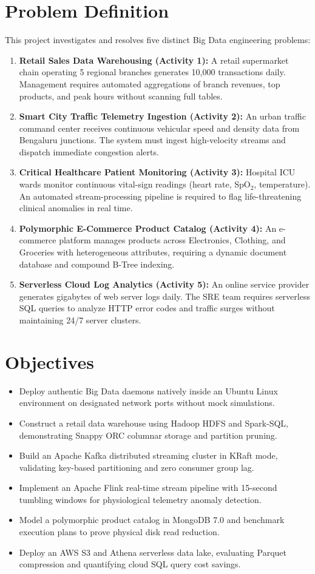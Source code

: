 \documentclass[12pt,a4paper]{report}
\begin{document}
\section{Problem Definition}
This project investigates and resolves five distinct Big Data engineering problems:
\begin{enumerate}
    \item \textbf{Retail Sales Data Warehousing (Activity 1):} A retail supermarket chain operating 5 regional branches generates 10,000 transactions daily. Management requires automated aggregations of branch revenues, top products, and peak hours without scanning full tables.
    \item \textbf{Smart City Traffic Telemetry Ingestion (Activity 2):} An urban traffic command center receives continuous vehicular speed and density data from Bengaluru junctions. The system must ingest high-velocity streams and dispatch immediate congestion alerts.
    \item \textbf{Critical Healthcare Patient Monitoring (Activity 3):} Hospital ICU wards monitor continuous vital-sign readings (heart rate, SpO$_2$, temperature). An automated stream-processing pipeline is required to flag life-threatening clinical anomalies in real time.
    \item \textbf{Polymorphic E-Commerce Product Catalog (Activity 4):} An e-commerce platform manages products across Electronics, Clothing, and Groceries with heterogeneous attributes, requiring a dynamic document database and compound B-Tree indexing.
    \item \textbf{Serverless Cloud Log Analytics (Activity 5):} An online service provider generates gigabytes of web server logs daily. The SRE team requires serverless SQL queries to analyze HTTP error codes and traffic surges without maintaining 24/7 server clusters.
\end{enumerate}

\section{Objectives}
\begin{itemize}
    \item Deploy authentic Big Data daemons natively inside an Ubuntu Linux environment on designated network ports without mock simulations.
    \item Construct a retail data warehouse using Hadoop HDFS and Spark-SQL, demonstrating Snappy ORC columnar storage and partition pruning.
    \item Build an Apache Kafka distributed streaming cluster in KRaft mode, validating key-based partitioning and zero consumer group lag.
    \item Implement an Apache Flink real-time stream pipeline with 15-second tumbling windows for physiological telemetry anomaly detection.
    \item Model a polymorphic product catalog in MongoDB 7.0 and benchmark execution plans to prove physical disk read reduction.
    \item Deploy an AWS S3 and Athena serverless data lake, evaluating Parquet compression and quantifying cloud SQL query cost savings.
\end{itemize}
\end{document}
